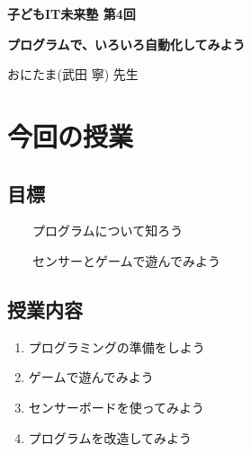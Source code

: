 

\begin{center}
    \par
    \par
    \par
    \par
    \vspace{30mm}
    {\Huge      }
    {\Huge{\bf 子どもIT未来塾 第4回}}
    \par
    \par
    \par
    \par
    \vspace{15mm}
    {\huge{\bf プログラムで、いろいろ自動化してみよう}}
    \par
    \par
    \par
    \par
    \vspace{15mm}
    {\Huge おにたま(武田 寧) 先生 }
\end{center}
\clearpage


\section{今回の授業}
\subsection{目標}
\ \ \ \ プログラムについて知ろう

\ \ \ \ センサーとゲームで遊んでみよう

\subsection{授業内容}
\begin{enumerate}
\item プログラミングの準備をしよう
\item ゲームで遊んでみよう
\item センサーボードを使ってみよう
\item プログラムを改造してみよう
\end{enumerate}
